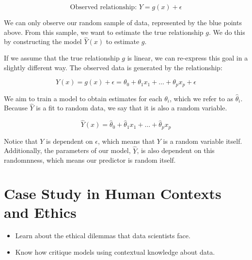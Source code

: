 \documentclass[
  letterpaper,
  DIV=11,
  numbers=noendperiod]{scrreprt}
\providecommand{\tightlist}{%
  \setlength{\itemsep}{0pt}\setlength{\parskip}{0pt}}\usepackage{longtable,booktabs,array}
\begin{document}
\[\text{Observed relationship: }Y = g(x) + \epsilon\]

We can only observe our random sample of data, represented by the blue
points above. From this sample, we want to estimate the true
relationship \(g\). We do this by constructing the model \(\hat{Y}(x)\)
to estimate \(g\).

If we assume that the true relationship \(g\) is linear, we can
re-express this goal in a slightly different way. The observed data is
generated by the relationship:

\[Y(x) = g(x) + \epsilon = \theta_0 + \theta_1 x_1 + \ldots + \theta_p x_p + \epsilon\]

We aim to train a model to obtain estimates for each \(\theta_i\), which
we refer to as \(\hat{\theta}_i\). Because \(\hat{Y}\) is a fit to
random data, we say that it is also a random variable.

\[\hat{Y}(x) = \hat{\theta}_0 + \hat{\theta}_1 x_1 + \ldots + \hat{\theta}_p x_p\]

Notice that \(Y\) is dependent on \(\epsilon\), which means that \(Y\)
is a random variable itself. Additionally, the parameters of our model,
\(\hat{Y}\), is also dependent on this randomnness, which means our
predictor is random itself.


\hypertarget{case-study-in-human-contexts-and-ethics}{%
\chapter{Case Study in Human Contexts and
Ethics}\label{case-study-in-human-contexts-and-ethics}}

\begin{tcolorbox}[enhanced jigsaw, breakable, colbacktitle=quarto-callout-note-color!10!white, colback=white, opacitybacktitle=0.6, opacityback=0, bottomrule=.15mm, titlerule=0mm, toptitle=1mm, bottomtitle=1mm, left=2mm, colframe=quarto-callout-note-color-frame, title=\textcolor{quarto-callout-note-color}{\faInfo}\hspace{0.5em}{Note}, rightrule=.15mm, toprule=.15mm, leftrule=.75mm, arc=.35mm, coltitle=black]

\begin{itemize}
\tightlist
\item
  Learn about the ethical dilemmas that data scientists face.
\item
  Know how critique models using contextual knowledge about data.
\end{itemize}

\end{tcolorbox}
\end{document}
